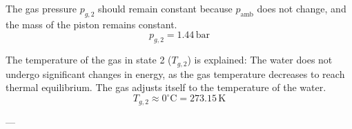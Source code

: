 The gas pressure \( p_{g,2} \) should remain constant because \( p_{\text{amb}} \) does not change, and the mass of the piston remains constant.  
\[
p_{g,2} = 1.44 \, \text{bar}
\]  

The temperature of the gas in state 2 (\( T_{g,2} \)) is explained:  
The water does not undergo significant changes in energy, as the gas temperature decreases to reach thermal equilibrium. The gas adjusts itself to the temperature of the water.  
\[
T_{g,2} \approx 0^\circ\text{C} = 273.15 \, \text{K}
\]  

---